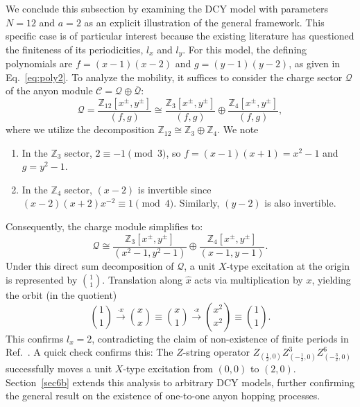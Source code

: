 \documentclass[aps,prb,english,superscriptaddress,twocolumn,tightenlines,showpacs,longbibliography,floatfix,amsfonts]{revtex4-2}
\begin{document}
We conclude this subsection by examining the DCY model with parameters $N=12$ and $a=2$ as an explicit illustration of the general framework. This specific case is of particular interest because the existing literature \cite{Delfino2023_2} has questioned the finiteness of its periodicities, $l_x$ and $l_y$. For this model, the defining polynomials are $f=(x-1)(x-2)$ and $g=(y-1)(y-2)$, as given in Eq.~\eqref{eq:poly2}. To analyze the mobility, it suffices to consider the charge sector $\mathcal{Q}$ of the anyon module $\mathcal{C}=\mathcal{Q}\oplus \overline{\mathcal{Q}}$:
\begin{equation}
\mathcal{Q} = \frac{\mathbb{Z}_{12}[x^{\pm}, y^{\pm}]}{(f, g)} \cong \frac{\mathbb{Z}_{3}[x^{\pm}, y^{\pm}]}{(f, g)} \oplus \frac{\mathbb{Z}_{4}[x^{\pm}, y^{\pm}]}{(f, g)},
\end{equation}
where we utilize the decomposition $\mathbb{Z}_{12} \cong \mathbb{Z}_3 \oplus \mathbb{Z}_4$. We note 
\begin{enumerate}
    \item In the $\mathbb{Z}_3$ sector, $2 \equiv -1 \pmod 3$, so $f = (x-1)(x+1) = x^2-1$ and $g = y^2-1$.
    \item In the $\mathbb{Z}_4$ sector, $(x-2)$ is invertible since $(x-2)(x+2)x^{-2} \equiv 1 \pmod 4$. Similarly, $(y-2)$ is also invertible.
\end{enumerate}
Consequently, the charge module simplifies to:
\begin{equation}
\mathcal{Q} \cong \frac{\mathbb{Z}_{3}[x^{\pm}, y^{\pm}]}{(x^2 - 1, y^2 - 1)} \oplus \frac{\mathbb{Z}_{4}[x^{\pm}, y^{\pm}]}{(x - 1, y - 1)}.
\end{equation}
Under this direct sum decomposition of $\mathcal{Q}$, a unit $X$-type excitation at the origin is represented by $1\choose 1$. Translation along $\hat{x}$ acts via multiplication by $x$, yielding the orbit (in the quotient)
\begin{equation}
{1 \choose 1}\xrightarrow{\cdot x}{x \choose x}\equiv{x \choose 1}\xrightarrow{\cdot x}{x^{2} \choose x^{2}}\equiv{1 \choose 1}.
\end{equation}
This confirms  $l_x = 2$, contradicting the claim of non-existence of finite periods in Ref.~\cite{Delfino2023_2}. A quick check confirms this: The $Z$-string operator $Z_{(\frac{1}{2},0)} Z_{(-\frac{1}{2},0)}^3 Z_{(-\frac{3}{2},0)}^6$ successfully moves a unit $X$-type excitation from $(0,0)$ to $(2,0)$. Section~\ref{sec6b} extends this analysis to arbitrary DCY models, further confirming the general result on the existence of one-to-one anyon hopping processes.
\end{document}
